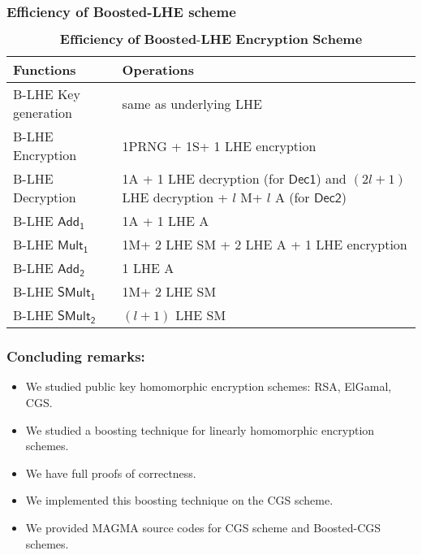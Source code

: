 \documentclass{beamer}
\begin{document}
\begin{frame}[t]
\frametitle{Efficiency of Boosted-LHE scheme}

\begin{table}
\centering
\caption{$\textbf{Efficiency of Boosted-LHE Encryption Scheme}$}\label{table:Eff. B-LHE}
\begin{tabular}{ |p{3cm}||p{8cm}|  }
 \hline
 \hline
 Functions & Operations\\
 \hline\hline
 B-LHE Key generation       & same as underlying LHE \\
 \hline
 B-LHE Encryption            & 1PRNG + 1S+ 1 LHE encryption \\
 \hline
 B-LHE Decryption            & 1A + 1 LHE decryption (for $\mathsf{Dec1}$) and $(2l+1)$ LHE decryption + $l$ M+ $l$ A (for $\mathsf{Dec2}$) \\
 \hline
 B-LHE $\mathsf{Add_1}$            & 1A + 1 LHE A \\
 \hline
 B-LHE $\mathsf{Mult_1}$      & 1M+ 2 LHE SM + 2 LHE A + 1 LHE encryption \\
 \hline
 B-LHE $\mathsf{Add_2}$           & 1 LHE A  \\
 \hline
 B-LHE $\mathsf{SMult_1}$   & 1M+ 2 LHE SM\\
  \hline
  B-LHE $\mathsf{SMult_2}$    & $(l+ 1)$ LHE SM \\
  \hline
\end{tabular}
\end{table}
\end{frame}


\begin{frame}[t]
\frametitle{Concluding remarks:}

\begin{itemize}
\item  We studied public key homomorphic encryption schemes: RSA, ElGamal, CGS.
\vspace*{3mm}
\item We studied a boosting technique for linearly homomorphic encryption schemes.
\vspace*{3mm}
\item We have full proofs of correctness.
\vspace*{3mm}
\item We implemented this boosting technique on the CGS scheme.
\vspace*{3mm}
\item We provided MAGMA source codes for CGS scheme and Boosted-CGS schemes.
\end{itemize}
\end{frame}
\end{document}
